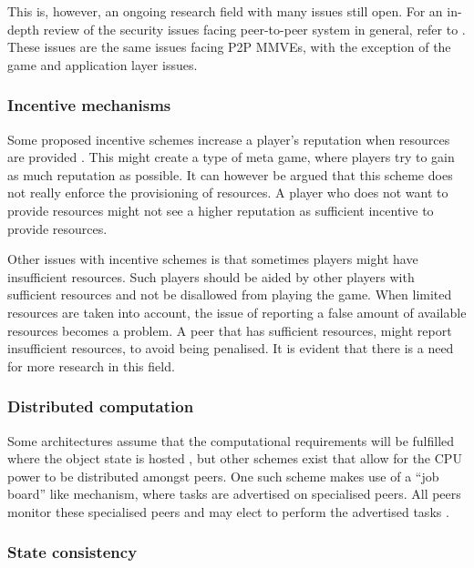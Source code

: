 This is, however, an ongoing research field with many issues still open. For an in-depth review of the security issues facing peer-to-peer system in general, refer to \cite{p2p_security_issues}. These issues are the same issues facing P2P MMVEs, with the exception of the game and application layer issues.

\subsubsection{Incentive mechanisms}

Some proposed incentive schemes increase a player's reputation when resources are provided  \cite{classic_p2p_reputation} \cite{proactive_reputation}. This might create a type of meta game, where players try to gain as much reputation as possible. It can however be argued that this scheme does not really enforce the provisioning of resources. A player who does not want to provide resources might not see a higher reputation as sufficient incentive to provide resources.

Other issues with incentive schemes is that sometimes players might have insufficient resources. Such players should be aided by other players with sufficient resources and not be disallowed from playing the game. When limited resources are taken into account, the issue of reporting a false amount of available resources becomes a problem. A peer that has sufficient resources, might report insufficient resources, to avoid being penalised. It is evident that there is a need for more research in this field.

\subsubsection{Distributed computation}

Some architectures assume that the computational requirements will be fulfilled where the object state is hosted \cite{solipsis}, but other schemes exist that allow for the CPU power to be distributed amongst peers. One such scheme makes use of a ``job board'' like mechanism, where tasks are advertised on specialised peers. All peers monitor these specialised peers and may elect to perform the advertised tasks \cite{fan_mediator_paper}.

\subsubsection{State consistency}

